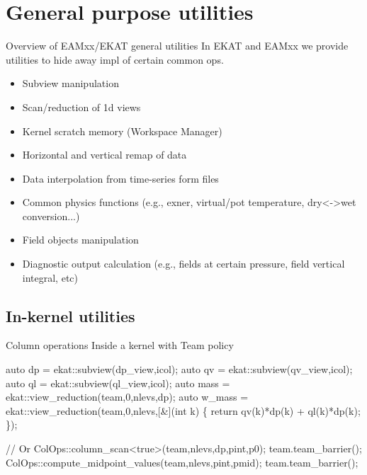 \documentclass[8pt,NM,theme=angles,number=SAND2025-01977PE]{sandia-beamer}
\begin{document}
\section{General purpose utilities}
\begin{frame}{Overview of EAMxx/EKAT general utilities}
  In EKAT and EAMxx we provide utilities to hide away impl of certain common ops.
  \begin{itemize}
    \item Subview manipulation
    \item Scan/reduction of 1d views
    \item Kernel scratch memory (Workspace Manager)
    \item Horizontal and vertical remap of data
    \item Data interpolation from time-series form files
    \item Common physics functions (e.g., exner, virtual/pot temperature, dry<->wet conversion...)
    \item Field objects manipulation
    \item Diagnostic output calculation (e.g., fields at certain pressure, field vertical integral, etc)
  \end{itemize}
\end{frame}

\subsection{In-kernel utilities}
\begin{frame}[fragile]{Column operations}
  Inside a kernel with Team policy
  \begin{semiverbatim} \small
      auto dp = ekat::subview(dp\_view,icol);
      auto qv = ekat::subview(qv\_view,icol);
      auto ql = ekat::subview(ql\_view,icol);
      auto mass = ekat::view\_reduction(team,0,nlevs,dp);
      auto w\_mass = ekat::view\_reduction(team,0,nlevs,[&](int k) \{
        return qv(k)*dp(k) + ql(k)*dp(k);
      \});

      // Or
      ColOps::column\_scan<true>(team,nlevs,dp,pint,p0);
      team.team\_barrier();
      ColOps::compute\_midpoint\_values(team,nlevs,pint,pmid);
      team.team\_barrier();
  \end{semiverbatim}
\end{frame}
\end{document}
